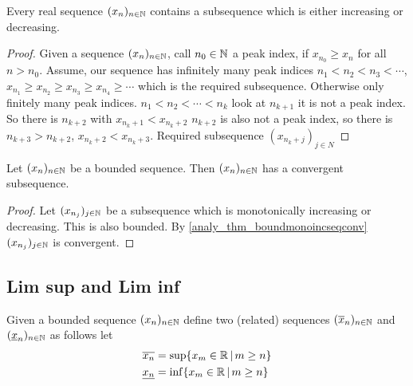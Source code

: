 \documentclass[10pt, a4paper]{article}
\newcommand{\seq}[1][x]{(#1_n)_{n \in \N}}
\begin{document}
\begin{lemma}
    Every real sequence $\seq$ contains a subsequence which is either increasing or decreasing.
    \begin{proof}
        Given a sequence $\seq$,
        call $n_0 \in \mathbb{N}$ a peak index,
        if $x_{n_0} \geq x_n$ for all $n > n_0$.
        Assume,
        our sequence has infinitely many peak indices
        $n_1 < n_2 < n_3 < \dotsi$,
        $x_{n_1} \geq x_{n_2} \geq x_{n_3} \geq x_{n_4} \geq \dotsi$ which is the required subsequence.
        Otherwise only finitely many peak indices.
        $n_1 < n_2 < \dotsi < n_k$ look at $n_{k + 1}$ it is not a peak index.
        So there is $n_{k + 2}$ with $x_{n_k + 1} < x_{n_k + 2}$
        $n_{k + 2}$ is also not a peak index,
        so there is $n_{k + 3} > n_{k + 2}$,
        $x_{n_k + 2} < x_{n_k + 3}$.
        Required subsequence $(x_{n_k + j})_{j \in N}$
    \end{proof}
\end{lemma}

\begin{theorem}\label{analy_thm_bolzanoweierstrass}
    Let $\seq$ be a bounded sequence.
    Then $\seq$ has a convergent subsequence.
    \begin{proof}
        Let $(x_{n_j})_{j \in \mathbb{N}}$ be a subsequence which is monotonically increasing or decreasing.
        This is also bounded.
        By \autoref{analy_thm_boundmonoincseqconv} $(x_{n_j})_{j \in \mathbb{N}}$ is convergent.
    \end{proof}
\end{theorem}

\subsection{Lim sup and Lim inf}
Given a bounded sequence $\seq$ define two
(related)
sequences $\seq[\overline{x}]$ and $\seq[\underline{x}]$ as follows let
\begin{align*}
    \overline{x_n} &= \sup\{x_m \in \mathbb{R}\,|\,m \geq n\} \\
    \underline{x_n} &= \inf\{x_m \in \mathbb{R}\,|\,m \geq n\}
\end{align*}
\end{document}
